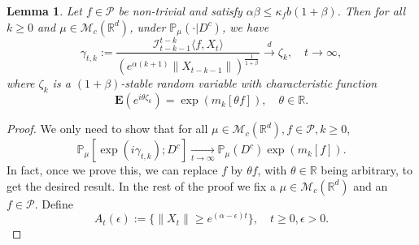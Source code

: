 \documentclass[12pt,a4paper]{amsart}
\theoremstyle{plain}
\newtheorem{lem}[thm]{Lemma}
\theoremstyle{definition}
\numberwithin{equation}{section}
\begin{document}
\begin{lem}\label{lem: mainlemma}
Let $f\in \mathcal{P}$ be non-trivial and satisfy $\alpha\beta\leq \kappa_fb(1+\beta)$.
    Then for all $k\geq 0$ and $\mu \in \mathcal M_c(\mathbb R^d)$, under $\mathbb{P}_{\mu}(\cdot | D ^c)$, we have
\begin{equation}
    \gamma_{t,k}
    :=\frac{\mathcal I_{t-k-1}^{t-k}\langle f ,X_t\rangle}{(e^{\alpha (k+1)}\|X_{t-k-1}\|)^{\frac{1}{1+\beta}}}\xrightarrow{d}\zeta_k, \quad t\rightarrow \infty, \label{limitdistribution1}
\end{equation}
    where $\zeta_k$ is a $(1+\beta)$-stable random variable with characteristic function
\[
    \mathbf{E}(e^{i\theta\zeta_k})
    =\exp(m_k[\theta f]),\quad \theta \in \mathbb R.
\]
\end{lem}
\begin{proof}
    We only need to show that for all $\mu \in \mathcal M_c(\mathbb R^d), f\in \mathcal P, k \geq 0$,
\begin{equation}
    \mathbb{P}_{\mu}[\exp(i\gamma_{t,k}); D^c]
    \xrightarrow[t\rightarrow \infty]{}\mathbb{P}_{\mu}(D^c)\exp(m_k[f]).
\end{equation}
    In fact, once we prove this, we can replace $f$ by $\theta f$, with $\theta \in \mathbb R$ being  arbitrary,  to get the desired result.
    In the rest of the proof we fix a $\mu \in \mathcal M_c(\mathbb R^d)$ and an $f\in \mathcal P$.
    Define
\[
    A_t(\epsilon)
    :=\{ \|X_t\| \geq e^{(\alpha - \epsilon)t} \},
    \quad t\geq 0, \epsilon > 0.
\]


\end{proof}
\end{document}
